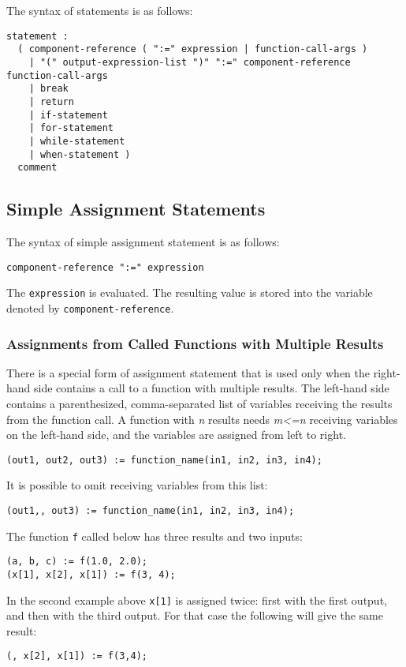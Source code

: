 The syntax of statements is as follows:
\begin{lstlisting}[language=grammar]
statement :
  ( component-reference ( ":=" expression | function-call-args )
    | "(" output-expression-list ")" ":=" component-reference function-call-args
    | break
    | return
    | if-statement
    | for-statement
    | while-statement
    | when-statement )
  comment
\end{lstlisting}

\subsection{Simple Assignment Statements}\label{simple-assignment-statements}

The syntax of simple assignment statement is as follows:
\begin{lstlisting}[language=grammar]
component-reference ":=" expression
\end{lstlisting}

The \lstinline!expression! is evaluated. The resulting value is stored into the
variable denoted by \lstinline!component-reference!.

\subsubsection{Assignments from Called Functions with Multiple Results}\label{assignments-from-called-functions-with-multiple-results}

There is a special form of assignment statement that is used only when
the right-hand side contains a call to a function with multiple results.
The left-hand side contains a parenthesized, comma-separated list of
variables receiving the results from the function call. A function with
\emph{n} results needs \emph{m\textless{}=n} receiving variables on the
left-hand side, and the variables are assigned from left to right.

\begin{lstlisting}[language=modelica]
(out1, out2, out3) := function_name(in1, in2, in3, in4);
\end{lstlisting}

It is possible to omit receiving variables from this list:
\begin{lstlisting}[language=modelica]
(out1,, out3) := function_name(in1, in2, in3, in4);
\end{lstlisting}

\begin{example}
The function \lstinline!f! called below has three results and two inputs:
\begin{lstlisting}[language=modelica]
(a, b, c) := f(1.0, 2.0);
(x[1], x[2], x[1]) := f(3, 4);
\end{lstlisting}
In the second example above \lstinline!x[1]! is assigned twice: first with the first output, and then with the third output.  For that case the following will give the same result:
\begin{lstlisting}[language=modelica]
(, x[2], x[1]) := f(3,4);
\end{lstlisting}
\end{example}

